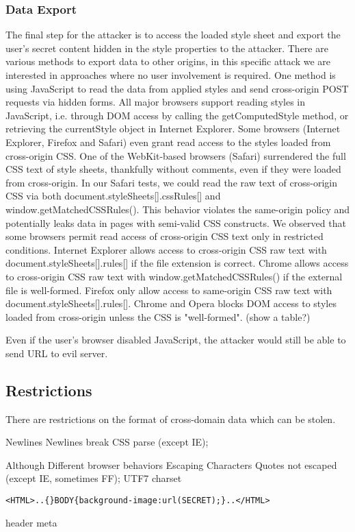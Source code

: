 \documentclass{acm_proc_article-sp}
\begin{document}
\subsubsection{Data Export}
The final step for the attacker is to access the loaded style sheet and export the user's secret content hidden in the style properties to the attacker. There are various methods to export data to other origins, in this specific attack we are interested in approaches where no user involvement is required. One method is using JavaScript to read the data from applied styles and send cross-origin POST requests via hidden forms. All major browsers support reading styles in JavaScript, i.e. through DOM access by calling the getComputedStyle method, or retrieving the currentStyle object in Internet Explorer. Some browsers (Internet Explorer, Firefox and Safari) even grant read access to the styles loaded from cross-origin CSS. One of the WebKit-based browsers (Safari) surrendered the full CSS text of style sheets, thankfully without comments, even if they were loaded from cross-origin. In our Safari tests, we could read the raw text of cross-origin CSS via both document.styleSheets[].cssRules[] and window.getMatchedCSSRules(). This behavior violates the same-origin policy and potentially leaks data in pages with semi-valid CSS constructs. We observed that some browsers permit read access of cross-origin CSS text only in restricted conditions. Internet Explorer allows access to cross-origin CSS raw text with document.styleSheets[].rules[] if the file extension is correct. Chrome allows access to cross-origin CSS raw text with window.getMatchedCSSRules() if the external file is well-formed. Firefox only allow access to same-origin CSS raw text with document.styleSheets[].rules[]. Chrome and Opera blocks DOM access to styles loaded from cross-origin unless the CSS is "well-formed".
(show a table?)

Even if the user's browser disabled JavaScript, the attacker would still be able to send URL to evil server.

\subsection{Restrictions}
There are restrictions on the format of cross-domain data which can be stolen.

Newlines
Newlines break CSS parse (except IE);

Although Different browser behaviors
Escaping Characters
Quotes not escaped (except IE, sometimes FF);
UTF7 charset
\begin{verbatim}
<HTML>..{}BODY{background-image:url(SECRET);}..</HTML>
\end{verbatim}
header meta
\end{document}
